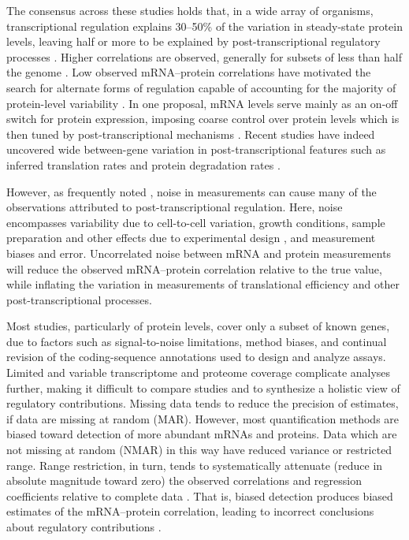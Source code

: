 \documentclass[10pt]{article}
\begin{document}
The consensus across these studies holds that, in a wide array of
organisms, transcriptional regulation explains 30--50\% of the
variation in steady-state protein levels, leaving half or more to
be explained by post-transcriptional regulatory processes
\cite{Nie2006a,brockmann07,Schmidt2007,
  castrillo07,Wu2008,maier09,schwanhausser11,Vogel2010,vogel12,wang12}. Higher
correlations are observed, generally for subsets of less than half the
genome \cite{desousa09,lu07,vogel12}. Low observed mRNA--protein
correlations have motivated the search for alternate forms of
regulation capable of accounting for the majority of protein-level
variability \cite{castrillo07,schwanhausser11,vogel12}. In one proposal, mRNA levels serve mainly as an on-off switch for protein expression, imposing coarse control over protein levels which is then tuned by post-transcriptional mechanisms \cite{vogel12}. Recent
studies have indeed uncovered wide between-gene variation in
post-transcriptional features such as inferred translation rates
\cite{ingolia09} and protein degradation rates
\cite{schwanhausser11}.

However, as frequently noted \cite{greenbaum03,Nie2006a,desousa09,futcher99,maier09,
  vogel12,li14}, noise in measurements can cause many of the
observations attributed to post-transcriptional regulation. Here,
noise encompasses variability due to cell-to-cell variation, growth
conditions, sample preparation and other effects due to experimental
design \cite{leek10}, and measurement biases and
error\cite{Nie2006a,li14,Li2015}. Uncorrelated noise between mRNA and protein
measurements will reduce the observed mRNA--protein correlation
relative to the true value\cite{spearman04}, while inflating the variation in
measurements of translational efficiency and other post-transcriptional
processes.

Most studies, particularly of protein levels, cover only a subset of known genes, due to factors such as signal-to-noise limitations, method biases, and continual revision of the coding-sequence annotations used to design and analyze assays. Limited and variable transcriptome and proteome coverage complicate analyses further, making it difficult to compare studies and to synthesize a holistic view of regulatory contributions. Missing data tends to reduce the precision of estimates, if data are missing at random (MAR). However, most quantification methods are biased toward detection of more abundant mRNAs and proteins\cite{vogel12}. Data which are not missing at random (NMAR) in this way have reduced variance or restricted range. Range restriction, in turn, tends to systematically attenuate (reduce in absolute magnitude toward zero) the observed correlations and regression coefficients relative to complete data \cite{Pearson1903, Alexander1985}. That is, biased detection produces biased estimates of the mRNA--protein correlation, leading to incorrect conclusions about regulatory contributions \cite{Franks2014}.
\end{document}
